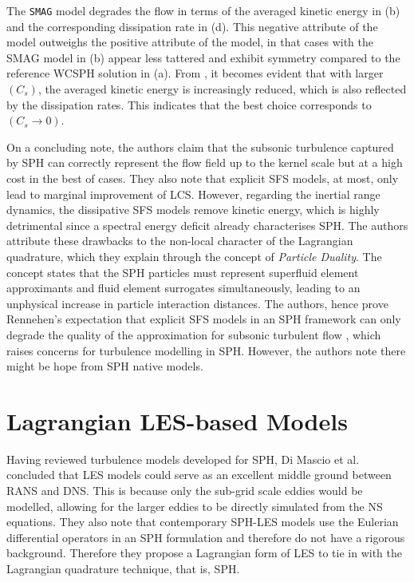 The \texttt{SMAG} model degrades the flow in terms of the averaged kinetic energy in  (b) and the corresponding dissipation rate in  (d). This negative attribute of the model outweighs the positive attribute of the model, in that cases with the SMAG model in  (b) appear less tattered and exhibit symmetry compared to the reference WCSPH solution in  (a).
From , it becomes evident that with larger $(C_s)$, the averaged kinetic energy is increasingly reduced, which is also reflected by the dissipation rates. This indicates that the best choice corresponds to $(C_s \rightarrow 0)$.

On a concluding note, the authors claim that the subsonic turbulence captured by SPH can correctly represent the flow field up to the kernel scale but at a high cost in the best of cases. They also note that explicit SFS
models, at most, only lead to marginal improvement of LCS. However, regarding the inertial range dynamics, the dissipative SFS models remove kinetic energy, which is highly detrimental since a spectral energy deficit already characterises SPH. The authors attribute these drawbacks to the non-local character of the Lagrangian quadrature, which they explain through the concept of \textit{Particle Duality}. The concept states that the SPH particles must represent superfluid element approximants and fluid element surrogates simultaneously, leading to an unphysical increase in particle interaction distances. The authors, hence
prove Rennehen’s expectation that explicit SFS models in an SPH framework can only degrade the quality of the approximation for subsonic turbulent flow \parencite{rennehan2021mixing}, which raises concerns for turbulence modelling in SPH. However, the authors note there might be hope from SPH native models.

\section{Lagrangian LES-based Models}
\label{sec:lagrangian-les-based-model}
Having reviewed turbulence models developed for SPH, Di Mascio et al. \parencite{DiMascio2017} concluded that LES models could serve as an excellent middle ground between RANS and DNS. This is because only the sub-grid scale eddies would be modelled, allowing for the larger eddies to be directly simulated from the NS equations. They also note that contemporary SPH-LES models use the Eulerian differential operators in an SPH formulation and therefore do not have a rigorous background. Therefore they propose a Lagrangian form of LES to tie in with the Lagrangian quadrature technique, that is, SPH. 

